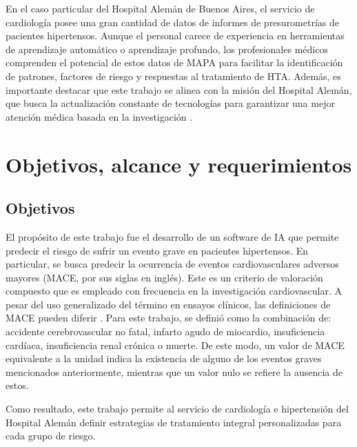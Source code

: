 En el caso particular del Hospital Alemán de Buenos Aires, el servicio de cardiología posee una gran cantidad de 
datos de informes de presurometrías de pacientes hipertensos. Aunque el personal carece de experiencia en herramientas 
de aprendizaje automático o aprendizaje profundo, los profesionales médicos comprenden el potencial de estos datos de 
MAPA para facilitar la identificación de patrones, factores de riesgo y respuestas al tratamiento de HTA. Además, 
es importante destacar que este trabajo se alinea con la misión del Hospital Alemán, que busca la actualización constante 
de tecnologías para garantizar una mejor atención médica basada en la investigación \citep{CITE:9}. 



\section{Objetivos, alcance y requerimientos}

\subsection{Objetivos}
El propósito de este trabajo fue el desarrollo de un software de IA que permite predecir el riesgo de sufrir un evento 
grave en pacientes hipertensos. En particular, se busca predecir la ocurrencia de eventos cardiovasculares adversos 
mayores (MACE, por sus siglas en inglés). Este es un criterio de valoración compuesto que es empleado con frecuencia 
en la investigación cardiovascular. A pesar del uso generalizado del término en ensayos clínicos, las definiciones de 
MACE pueden diferir \citep{CITE:10}. Para este trabajo, se definió como la combinación de: accidente cerebrovascular no 
fatal, infarto agudo de miocardio, insuficiencia cardíaca, insuficiencia renal crónica o muerte. De este modo, un valor 
de MACE equivalente a la unidad indica la existencia de alguno de los eventos graves mencionados anteriormente, mientras 
que un valor nulo se refiere la ausencia de estos. 

Como resultado, este trabajo permite al servicio de cardiología e hipertensión del Hospital Alemán definir estrategias 
de tratamiento integral personalizadas para cada grupo de riesgo. 


